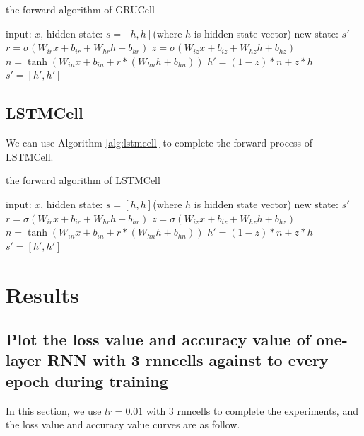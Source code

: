 \documentclass{elegantbook}
\begin{document}
\begin{algorithm}[H]
	\caption{\label{alg:grucell}the forward algorithm of GRUCell}
	\begin{algorithmic}[1]
		\Require input: $x$, hidden state: $s=[h, h]$(where $h$ is hidden state vector)
		\Ensure new state: $s'$
		\State $r = \sigma(W_{ir} x + b_{ir} + W_{hr} h + b_{hr})$
		\State $z = \sigma(W_{iz} x + b_{iz} + W_{hz} h + b_{hz})$
		\State $n = \tanh(W_{in} x + b_{in} + r * (W_{hn} h + b_{hn}))$
		\State $h' = (1 - z) * n + z * h$
		\State \Return $s'=[h', h']$
	\end{algorithmic}
\end{algorithm}

\section{LSTMCell}
We can use Algorithm \ref{alg:lstmcell} to complete the forward process of LSTMCell.

\begin{algorithm}[H]
	\caption{\label{alg:lstmcell}the forward algorithm of LSTMCell}
	\begin{algorithmic}[1]
		\Require input: $x$, hidden state: $s=[h, h]$(where $h$ is hidden state vector)
		\Ensure new state: $s'$
		\State $r = \sigma(W_{ir} x + b_{ir} + W_{hr} h + b_{hr})$
		\State $z = \sigma(W_{iz} x + b_{iz} + W_{hz} h + b_{hz})$
		\State $n = \tanh(W_{in} x + b_{in} + r * (W_{hn} h + b_{hn}))$
		\State $h' = (1 - z) * n + z * h$
		\State \Return $s'=[h', h']$
	\end{algorithmic}
\end{algorithm}

\chapter{Results}
\section{Plot the loss value and accuracy value of one-layer RNN with 3 rnncells against to every epoch during training}
In this section, we use $lr=0.01$ with 3 rnncells to complete the experiments, and the loss value and accuracy value curves are as follow.
\end{document}
